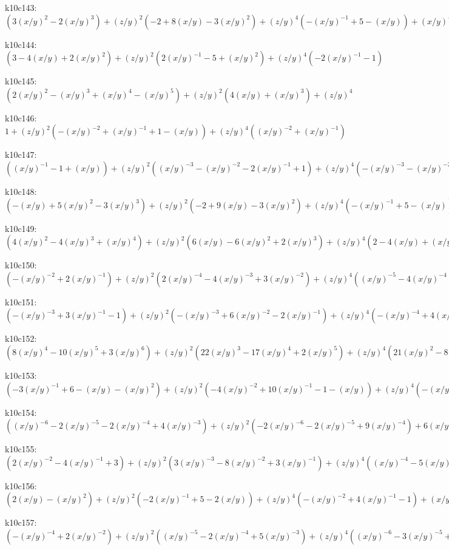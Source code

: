 k10c143: $ (3(x/y)^{2}-2(x/y)^{3})  +(z/y)^{2}(-2+8(x/y)-3(x/y)^{2})  +(z/y)^{4}(-(x/y)^{-1}+5-(x/y))  +(x/y)^{-1}(z/y)^{6} $ 

k10c144: $ (3-4(x/y)+2(x/y)^{2})  +(z/y)^{2}(2(x/y)^{-1}-5+(x/y)^{2})  +(z/y)^{4}(-2(x/y)^{-1}-1) $ 

k10c145: $ (2(x/y)^{2}-(x/y)^{3}+(x/y)^{4}-(x/y)^{5})  +(z/y)^{2}(4(x/y)+(x/y)^{3})  +(z/y)^{4} $ 

k10c146: $ 1  +(z/y)^{2}(-(x/y)^{-2}+(x/y)^{-1}+1-(x/y))  +(z/y)^{4}((x/y)^{-2}+(x/y)^{-1}) $ 

k10c147: $ ((x/y)^{-1}-1+(x/y))  +(z/y)^{2}((x/y)^{-3}-(x/y)^{-2}-2(x/y)^{-1}+1)  +(z/y)^{4}(-(x/y)^{-3}-(x/y)^{-2}) $ 

k10c148: $ (-(x/y)+5(x/y)^{2}-3(x/y)^{3})  +(z/y)^{2}(-2+9(x/y)-3(x/y)^{2})  +(z/y)^{4}(-(x/y)^{-1}+5-(x/y))  +(x/y)^{-1}(z/y)^{6} $ 

k10c149: $ (4(x/y)^{2}-4(x/y)^{3}+(x/y)^{4})  +(z/y)^{2}(6(x/y)-6(x/y)^{2}+2(x/y)^{3})  +(z/y)^{4}(2-4(x/y)+(x/y)^{2})  -(z/y)^{6} $ 

k10c150: $ (-(x/y)^{-2}+2(x/y)^{-1})  +(z/y)^{2}(2(x/y)^{-4}-4(x/y)^{-3}+3(x/y)^{-2})  +(z/y)^{4}((x/y)^{-5}-4(x/y)^{-4}+(x/y)^{-3})  -(x/y)^{-5}(z/y)^{6} $ 

k10c151: $ (-(x/y)^{-3}+3(x/y)^{-1}-1)  +(z/y)^{2}(-(x/y)^{-3}+6(x/y)^{-2}-2(x/y)^{-1})  +(z/y)^{4}(-(x/y)^{-4}+4(x/y)^{-3}-(x/y)^{-2})  +(x/y)^{-4}(z/y)^{6} $ 

k10c152: $ (8(x/y)^{4}-10(x/y)^{5}+3(x/y)^{6})  +(z/y)^{2}(22(x/y)^{3}-17(x/y)^{4}+2(x/y)^{5})  +(z/y)^{4}(21(x/y)^{2}-8(x/y)^{3})  +(z/y)^{6}(8(x/y)-(x/y)^{2})  +(z/y)^{8} $ 

k10c153: $ (-3(x/y)^{-1}+6-(x/y)-(x/y)^{2})  +(z/y)^{2}(-4(x/y)^{-2}+10(x/y)^{-1}-1-(x/y))  +(z/y)^{4}(-(x/y)^{-3}+6(x/y)^{-2})  +(x/y)^{-3}(z/y)^{6} $ 

k10c154: $ ((x/y)^{-6}-2(x/y)^{-5}-2(x/y)^{-4}+4(x/y)^{-3})  +(z/y)^{2}(-2(x/y)^{-6}-2(x/y)^{-5}+9(x/y)^{-4})  +6(x/y)^{-5}(z/y)^{4}  +(x/y)^{-6}(z/y)^{6} $ 

k10c155: $ (2(x/y)^{-2}-4(x/y)^{-1}+3)  +(z/y)^{2}(3(x/y)^{-3}-8(x/y)^{-2}+3(x/y)^{-1})  +(z/y)^{4}((x/y)^{-4}-5(x/y)^{-3}+(x/y)^{-2})  -(x/y)^{-4}(z/y)^{6} $ 

k10c156: $ (2(x/y)-(x/y)^{2})  +(z/y)^{2}(-2(x/y)^{-1}+5-2(x/y))  +(z/y)^{4}(-(x/y)^{-2}+4(x/y)^{-1}-1)  +(x/y)^{-2}(z/y)^{6} $ 

k10c157: $ (-(x/y)^{-4}+2(x/y)^{-2})  +(z/y)^{2}((x/y)^{-5}-2(x/y)^{-4}+5(x/y)^{-3})  +(z/y)^{4}((x/y)^{-6}-3(x/y)^{-5}+2(x/y)^{-4})  -(x/y)^{-6}(z/y)^{6} $ 

